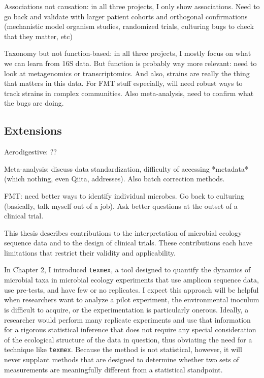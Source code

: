 Associations not causation: in all three projects, I only show associations. Need to go back and validate with larger patient cohorts and orthogonal confirmations (mechanistic model organism studies, randomized trials, culturing bugs to check that they matter, etc)

Taxonomy but not function-based: in all three projects, I mostly focus on what we can learn from 16S data. But function is probably way more relevant: need to look at metagenomics or transcriptomics. And also, strains are really the thing that matters in this data. For FMT stuff especially, will need robust ways to track strains in complex communities. Also meta-analysis, need to confirm what the bugs are doing.

\subsection{Extensions}

Aerodigestive: ??

Meta-analysis: discuss data standardization, difficulty of accessing *metadata* (which nothing, even Qiita, addresses). Also batch correction methods.

FMT: need better ways to identify individual microbes. Go back to culturing (basically, talk myself out of a job). Ask better questions at the outset of a clinical trial.

This thesis describes contributions to the interpretation of microbial
ecology sequence data and to the design of clinical trials. These contributions
each have limitations that restrict their validity and applicability.

In Chapter 2, I introduced \texttt{texmex}, a tool designed to quantify the dynamics of
microbial taxa in microbial ecology experiments that use amplicon sequence
data, use pre-tests, and have few or no replicates. I expect this approach
will be helpful when researchers want to analyze a pilot experiment, the
environmental inoculum is difficult to acquire, or the experimentation is
particularly onerous. Ideally, a researcher would perform many replicate
experiments and use that information for a rigorous statistical inference that
does not require any special consideration of the ecological structure of the
data in question, thus obviating the need for a technique like \texttt{texmex}.
Because the method is not statistical, however, it will never supplant
methods that are designed to determine whether two sets of measurements are
meaningfully different from a statistical standpoint.

